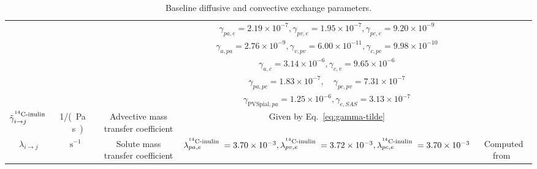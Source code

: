 \documentclass[a4paper,11pt]{article} %
\newcommand{\AP}[1]{\textcolor{blue}{AP: #1}}
\newcommand{\1}{^{(1)}}
\newcommand{\2}{^{(2)}}
\newcommand{\Cinulin}{$\prescript{14}{}{\text{C}}$-inulin }
\providecommand{\DIFdelbegin}{} %
\providecommand{\DIFaddendFL}{} %
\newcommand{\DIFscaledelfig}{0.5}
\newlength{\DIFdelgraphicswidth} %
\newlength{\DIFdelgraphicsheight} %
\newcommand{\DIFdelincludegraphics}[2][]{%
\sbox{\DIFdelgraphicsbox}{\DIFOincludegraphics[#1]{#2}}%
\settoboxwidth{\DIFdelgraphicswidth}{\DIFdelgraphicsbox} %
\settoboxtotalheight{\DIFdelgraphicsheight}{\DIFdelgraphicsbox} %
\scalebox{\DIFscaledelfig}{%
\parbox[b]{\DIFdelgraphicswidth}{\usebox{\DIFdelgraphicsbox}\\[-\baselineskip] \rule{\DIFdelgraphicswidth}{0em}}\llap{\resizebox{\DIFdelgraphicswidth}{\DIFdelgraphicsheight}{%
\setlength{\unitlength}{\DIFdelgraphicswidth}%
\begin{picture}(1,1)%
\thicklines\linethickness{2pt} %
{\color[rgb]{1,0,0}\put(0,0){\framebox(1,1){}}}%
{\color[rgb]{1,0,0}\put(0,0){\line( 1,1){1}}}%
{\color[rgb]{1,0,0}\put(0,1){\line(1,-1){1}}}%
\end{picture}%
}\hspace*{3pt}}} %
} %
\DeclareRobustCommand{\DIFdelbegin}{\DIFOdelbegin \let\includegraphics\DIFdelincludegraphics} %
\DeclareRobustCommand{\DIFaddendFL}{\DIFOaddendFL \let\includegraphics\DIFOincludegraphics} %
\begin{document}
\begin{table}[h]
{\begin{tabular}{c|c|c|c|c}
         & & & $ \gamma_{pa,e } = 2.19 \times 10^{-7}, \gamma_{pv,e} = 1.95 \times 10^{-7} , \gamma_{pc,e} = 9.20 \times 10^{-9} $ \\
         & & & $ \gamma_{a,pa} = 2.76 \times 10^{-9}, \gamma_{v,pv} = 6.00 \times 10^{-11},  \gamma_{c,pc} =9.98 \times 10^{-10} $ \\
         &&& $     \gamma_{a,c} = 3.14 \times 10^{-6} ,\gamma_{c,v} = 9.65  \times 10^{-6}$ \\
         &&& $   \gamma_{pa,pc} = 1.83 \times 10^{-7} ,\quad \gamma_{pc,pv} = 7.31  \times 10^{-7}$ \\
         &&& $\gamma_{\text{PVSpial},pa} =  1.25\times 10^{-6},\gamma_{e,SAS}  = 3.13\times 10^{-7} $\\
         $\tilde \gamma_{i\to j}^\text{\Cinulin}$ &\si{1/(\pascal \,  \second)} & Advective mass transfer coefficient & Given by Eq.~\eqref{eq:gamma-tilde} &\\
         $\lambda_{i\to j}$ & $\si{\second^{-1}}$ & Solute mass transfer coefficient & $\lambda_{pa,e}^\text{\Cinulin} = 3.70\times 10^{-3},  \lambda_{pv,e}^\text{\Cinulin} = 3.72 \times 10^{-3},  \lambda_{pc,e}^\text{\Cinulin} = 3.70\times 10^{-3} $ & Computed from~\cite{li2010permeability}
    \end{tabular}}
    \DIFaddendFL \caption{Baseline diffusive and convective exchange parameters.}
    \label{tab:exchange}
\end{table}



\DIFdelbegin %

\end{document}

